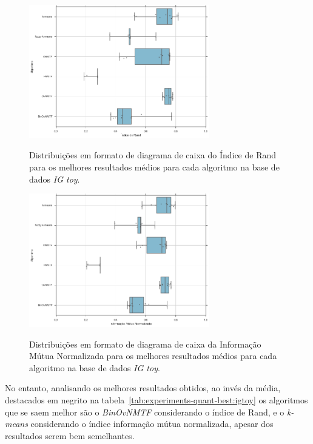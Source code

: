 \documentclass[
    12pt,                %
    oneside,            %
    a4paper,            %
    english,            %
    brazil                %
    ]{abntex2ppgsi}
\begin{document}
\begin{figure}[H]
    \centering
    \caption{Distribuições em formato de diagrama de caixa do Índice de Rand para os melhores resultados médios para cada algoritmo na base de dados \textit{IG toy}.}
    \includegraphics[width=0.7\textwidth]{img/boxplot-rand-igtoy.png}
    \label{fig:boxplot-rand:igtoy}
\end{figure}

\begin{figure}[H]
    \centering
    \caption{Distribuições em formato de diagrama de caixa da Informação Mútua Normalizada para os melhores resultados médios para cada algoritmo na base de dados \textit{IG toy}.}
    \includegraphics[width=0.7\textwidth]{img/boxplot-nmi-igtoy.png}
    \label{fig:boxplot-nmi:igtoy}
\end{figure}

No entanto, analisando os melhores resultados obtidos, ao invés da média, destacados em negrito na tabela~\ref{tab:experiments-quant-best:igtoy} os algoritmos que se saem melhor são o \textit{BinOvNMTF} considerando o índice de Rand, e o \textit{k-means} considerando o índice informação mútua normalizada, apesar dos resultados serem bem semelhantes.
\end{document}
